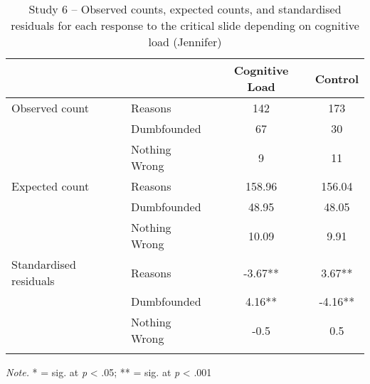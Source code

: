 \documentclass[
  american,
  man,floatsintext]{apa7}
\begin{document}
\begin{table}[tbp]

\begin{center}
\begin{threeparttable}

\caption{\label{tab:tabS6tab1dumbJennifer}Study 6 – Observed counts, expected counts, and standardised residuals for each response to the critical slide depending on cognitive load (Jennifer)}

\begin{tabular}{llcc}
\toprule
 & \multicolumn{1}{c}{} & \multicolumn{1}{c}{Cognitive Load} & \multicolumn{1}{c}{Control}\\
\midrule
Observed count & Reasons & 142 & 173\\
 & Dumbfounded & 67 & 30\\
 & Nothing Wrong & 9 & 11\\
Expected count & Reasons & 158.96 & 156.04\\
 & Dumbfounded & 48.95 & 48.05\\
 & Nothing Wrong & 10.09 & 9.91\\
Standardised residuals & Reasons & -3.67** & 3.67**\\
 & Dumbfounded & 4.16** & -4.16**\\
 & Nothing Wrong & -0.5 & 0.5\\
\bottomrule
\addlinespace
\end{tabular}

\begin{tablenotes}[para]
\normalsize{\textit{Note.} * = sig. at \emph{p} < .05; ** = sig. at \emph{p} < .001}
\end{tablenotes}

\end{threeparttable}
\end{center}

\end{table}
\end{document}
